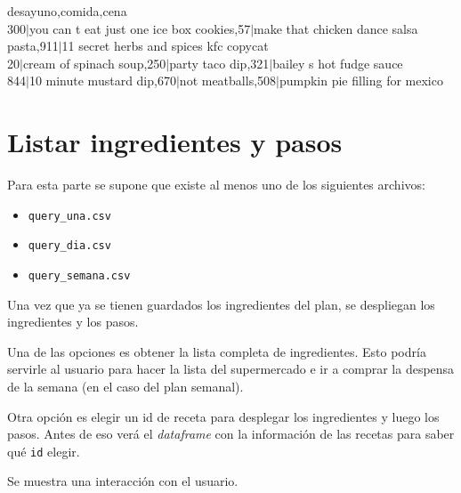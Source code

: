 \documentclass{article}
\begin{document}
desayuno,comida,cena\\
300$|$you can t eat just one ice box cookies,57$|$make that chicken dance salsa pasta,911$|$11 secret herbs and spices kfc copycat\\
20$|$cream of spinach soup,250$|$party taco dip,321$|$bailey s hot fudge sauce\\
844$|$10 minute mustard dip,670$|$not meatballs,508$|$pumpkin pie filling for mexico

\section{Listar ingredientes y pasos}

Para esta parte se supone que existe al menos uno de los siguientes archivos:
\begin{itemize}
\item \texttt{query\_una.csv}
\item \texttt{query\_dia.csv}
\item \texttt{query\_semana.csv}
\end{itemize}

Una vez que ya se tienen guardados los ingredientes del plan, se despliegan los ingredientes y los pasos.

Una de las opciones es obtener la lista completa de ingredientes. Esto podría servirle al usuario para hacer la lista del supermercado e ir a comprar la despensa de la semana (en el caso del plan semanal).

Otra opción es elegir un id de receta para desplegar los ingredientes y luego los pasos. Antes de eso verá el \textit{dataframe} con la información de las recetas para saber qué \texttt{id} elegir.

Se muestra una interacción con el usuario.
\end{document}
